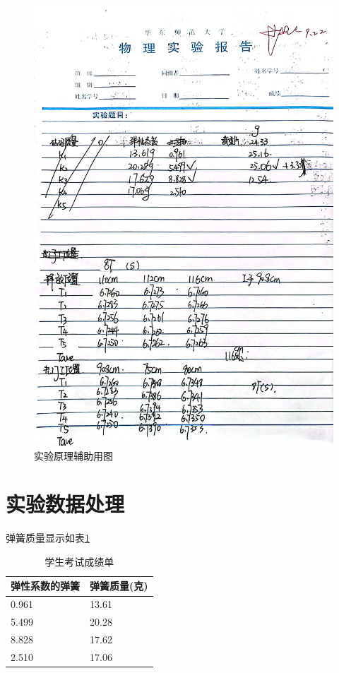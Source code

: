 \documentclass{ctexart}
\begin{document}
\begin{figure}[h]
  \centering
  \includegraphics[height=1\textwidth,width=1\textwidth]{yuanshishujv3.jpg}
  \caption{实验原理辅助用图}\label{yuanshishujv3}
\end{figure}
\newpage

\section{实验数据处理}
弹簧质量显示如表\ref{tanhuangzhiliang}
\begin{table}[h]
  \centering   
  \caption{学生考试成绩单}\label{tanhuangzhiliang}
  \begin{tabular}{| l || l |}
      \hline
      弹性系数的弹簧 & 弹簧质量(克)\\
      \hline
      0.961 & 13.61 \\
      \hline
      5.499 & 20.28 \\
      \hline
      8.828 & 17.62 \\
      \hline
      2.510 & 17.06 \\
      \hline                       
  \end{tabular}
\end{table}
\end{document}
